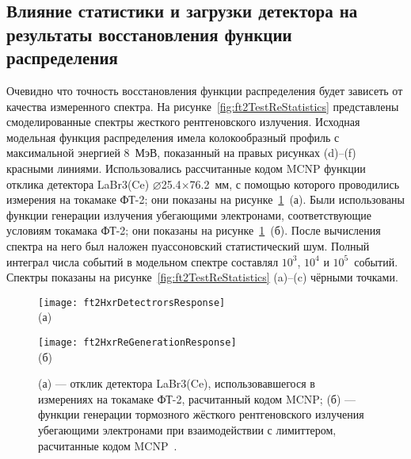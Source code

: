 
\subsection{ Влияние статистики и загрузки детектора на результаты восстановления функции распределения }

Очевидно что точность восстановления функции распределения будет зависеть от качества измеренного спектра. На рисунке~\ref{fig:ft2TestReStatistics} представлены смоделированные спектры жесткого рентгеновского излучения. Исходная модельная функция распределения имела колокообразный профиль с максимальной энергией 8~МэВ, показанный на правых рисунках (d)--(f) красными линиями. Использовались рассчитанные кодом MCNP функции отклика детектора LaBr3(Ce) $\varnothing$25.4$\times$76.2~мм, с помощью которого проводились измерения на токамаке ФТ-2; они показаны на рисунке~\ref{fig:ft2HxrDetectrorsAndReResponse}~(а). Были использованы функции генерации излучения убегающими электронами, соответствующие условиям токамака ФТ-2; они показаны на рисунке~\ref{fig:ft2HxrDetectrorsAndReResponse}~(б). После вычисления спектра на него был наложен пуассоновский статистический шум. Полный интеграл числа событий в модельном спектре составлял $10^3$, $10^4$ и $10^5$~событий. Спектры показаны на рисунке~\ref{fig:ft2TestReStatistics} (a)--(c) чёрными точками.~\cite{Shevelev2016}

\begin{figure}[ht!]
    \begin{minipage}[b][][b]{0.45\linewidth}\centering
      \texttt{[image: ft2HxrDetectrorsResponse]} \\ (а) \\
    \end{minipage}
    \hfill
    \begin{minipage}[b][][b]{0.45\linewidth}\centering
      \texttt{[image: ft2HxrReGenerationResponse]} \\ (б) \\
    \end{minipage}
    \vspace{5mm}
    \caption{ (а) --- отклик детектора LaBr3(Ce), использовавшегося в измерениях на токамаке ФТ-2, расчитанный кодом MCNP; (б) --- функции генерации тормозного жёсткого рентгеновского излучения убегающими электронами при взаимодействии с лимиттером, расчитанные кодом MCNP~\cite{Shevelev2016}. }
    \label{fig:ft2HxrDetectrorsAndReResponse}
\end{figure}

